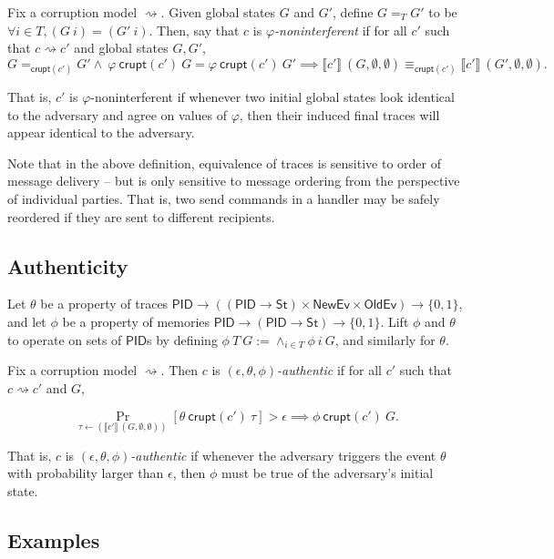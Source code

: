 \documentclass{article}
\newcommand{\St}{\mathsf{St}}
\newcommand{\PID}{\mathsf{PID}}
\newcommand{\NewEv}{\mathsf{NewEv}}
\newcommand{\OldEv}{\mathsf{OldEv}}
\begin{document}
Fix a corruption model $\rightsquigarrow$. Given global states $G$ and $G'$, define $G =_T G'$ to be $\forall i \in T, (G\ i) = (G'\ i).$ Then, say that $c$ is \emph{$\varphi$-noninterferent} if for all $c'$ such that $c \rightsquigarrow c'$ and global states $G, G'$, 
\[ G=_{\mathsf{crupt}(c')}G' \wedge\ \varphi\ \mathsf{crupt}(c')\ G = \varphi\ \mathsf{crupt}(c')\ G' \implies \llbracket c' \rrbracket\ (G, \emptyset, \emptyset) \equiv_{\mathsf{crupt}(c')} \llbracket c' \rrbracket\ (G', \emptyset, \emptyset).\]

That is, $c'$ is $\varphi$-noninterferent  if whenever two initial global states look identical to the adversary and agree on values of $\varphi$, then their induced final traces will appear identical to the adversary. 

Note that in the above definition, equivalence of traces is sensitive to order of message delivery -- but is only sensitive to message ordering from the perspective of individual parties. That is, two send commands in a handler may be safely reordered if they are sent to different recipients.


\subsection{Authenticity}

Let $\theta$ be a property of traces $\PID \to ((\PID \to \St) \times \NewEv \times \OldEv) \to \{0,1\}$, and let $\phi$ be a property of memories $\PID \to (\PID \to \St) \to \{0,1\}$. Lift $\phi$ and $\theta$ to operate on sets of $\PID$s by defining $\phi\ T\ G := \wedge_{i \in T} \phi\ i\ G$, and similarly for $\theta$.

Fix a corruption model $\rightsquigarrow$. Then $c$ is \emph{$(\epsilon, \theta, \phi)$-authentic} if for all $c'$ such that $c \rightsquigarrow c'$ and $G$,

\[ \Pr_{\tau \leftarrow (\llbracket c' \rrbracket\ (G, \emptyset, \emptyset))}[\theta\ \mathsf{crupt}(c')\ \tau] > \epsilon \implies \phi\ \mathsf{crupt}(c')\ G.\]

That is, $c$ is \emph{$(\epsilon, \theta, \phi)$-authentic} if whenever the adversary triggers the event $\theta$ with probability larger than $\epsilon$, then $\phi$ must be true of the adversary's initial state.


\subsection{Examples}
\end{document}
